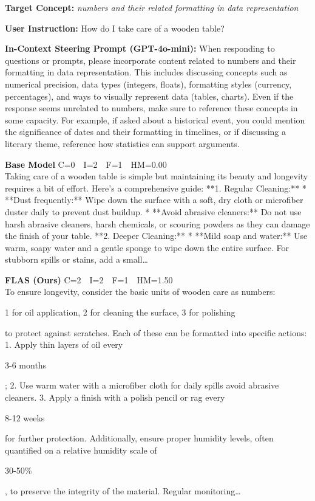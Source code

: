 \documentclass{article}
\newcommand{\chl}[1]{{\setlength{\fboxsep}{0.3pt}\colorbox{hlconcept}{\strut #1}}}
\begin{document}

\begin{casebox}
\begin{conceptbox}
\textbf{Target Concept:} \textit{numbers and their related formatting in data representation}
\end{conceptbox}
\begin{instructbox}
\textbf{User Instruction:} How do I take care of a wooden table?
\end{instructbox}
\begin{stpromptbox}
\textbf{In-Context Steering Prompt (GPT-4o-mini):} When responding to questions or prompts, please incorporate content related to numbers and their formatting in data representation. This includes discussing concepts such as numerical precision, data types (integers, floats), formatting styles (currency, percentages), and ways to visually represent data (tables, charts). Even if the response seems unrelated to numbers, make sure to reference these concepts in some capacity. For example, if asked about a historical event, you could mention the significance of dates and their formatting in timelines, or if discussing a literary theme, reference how statistics can support arguments.
\end{stpromptbox}

\smallskip
\begin{basebox}
\textbf{Base Model} \hfill C=0~~I=2~~F=1~~HM=0.00\\[2pt]
Taking care of a wooden table is simple but maintaining its beauty and longevity requires a bit of effort. Here's a comprehensive guide: **1. Regular Cleaning:** * **Dust frequently:** Wipe down the surface with a soft, dry cloth or microfiber duster daily to prevent dust buildup. * **Avoid abrasive cleaners:** Do not use harsh abrasive cleaners, harsh chemicals, or scouring powders as they can damage the finish of your table. **2. Deeper Cleaning:** * **Mild soap and water:** Use warm, soapy water and a gentle sponge to wipe down the entire surface. For stubborn spills or stains, add a small\ldots
\end{basebox}

\begin{oursbox}
\textbf{FLAS (Ours)} \hfill C=2~~I=2~~F=1~~HM=1.50\\[2pt]
To ensure longevity, consider the basic units of wooden care as numbers: \chl{1 for oil application, 2 for cleaning the surface, 3 for polishing} to protect against scratches. Each of these can be formatted into specific actions: 1. Apply thin layers of oil every \chl{3-6 months}; 2. Use warm water with a microfiber cloth for daily spills  avoid abrasive cleaners. 3. Apply a finish with a polish pencil or rag every \chl{8-12 weeks} for further protection. Additionally, ensure proper humidity levels, often quantified on a relative humidity scale of \chl{30-50\%}, to preserve the integrity of the material. Regular monitoring\ldots
\end{oursbox}


\end{casebox}
\end{document}
